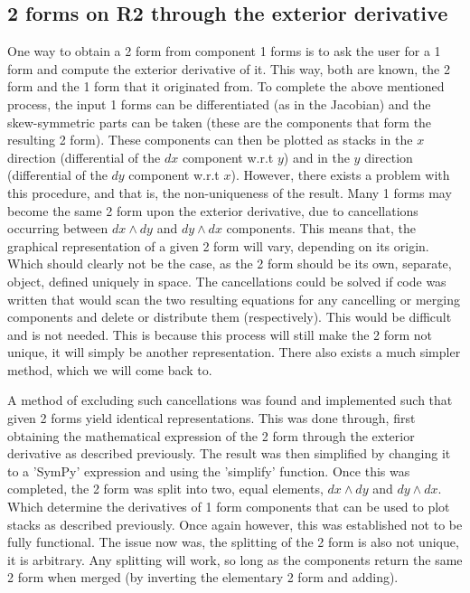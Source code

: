 \documentclass[11]{report}
\begin{document}
\subsection{2 forms on R2 through the exterior derivative}
One way to obtain a 2 form from component 1 forms is to ask the user for a 1 form and compute the exterior derivative of it. This way, both are known, the 2 form and the 1 form that it originated from. To complete the above mentioned process, the input 1 forms can be differentiated (as in the Jacobian) and the skew-symmetric parts can be taken (these are the components that form the resulting 2 form). These components can then be plotted as stacks in the $x$ direction (differential of the $dx$ component w.r.t $y$) and in the $y$ direction (differential of the $dy$ component w.r.t $x$). However, there exists a problem with this procedure, and that is, the non-uniqueness of the result. Many 1 forms may become the same 2 form upon the exterior derivative, due to cancellations occurring between $dx \wedge dy$ and $dy\wedge dx$ components. This means that, the graphical representation of a given 2 form will vary, depending on its origin. Which should clearly not be the case, as the 2 form should be its own, separate, object, defined uniquely in space.
The cancellations could be solved if code was written that would scan the two resulting equations for any cancelling or merging components and delete or distribute them (respectively). This would be difficult and is not needed. This is because this process will still make the 2 form not unique, it will simply be another representation. There also exists a much simpler method, which we will come back to.

A method of excluding such cancellations was found and implemented such that given 2 forms yield identical representations. This was done through, first obtaining the mathematical expression of the 2 form through the exterior derivative as described previously. The result was then simplified by changing it to a 'SymPy' expression and using the 'simplify' function. Once this was completed, the 2 form was split into two, equal elements, $dx \wedge dy$ and $dy\wedge dx$. Which determine the derivatives of 1 form components that can be used to plot stacks as described previously.
Once again however, this was established not to be fully functional. The issue now was, the splitting of the 2 form is also not unique, it is arbitrary. Any splitting will work, so long as the components return the same 2 form when merged (by inverting the elementary 2 form and adding).
\end{document}
